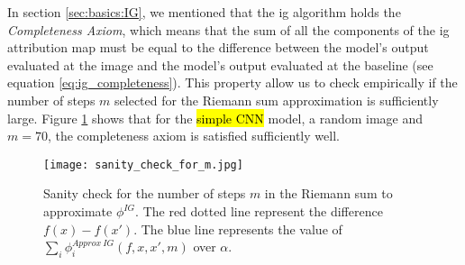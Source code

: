 In section \ref{sec:basics:IG}, we mentioned that the \gls{ig} algorithm holds the \textit{Completeness Axiom}, which means that the sum of all the components of the \gls{ig} attribution map must be equal to the difference between the model's output evaluated at the image and the model's output evaluated at the baseline (see equation \ref{eq:ig_completeness}). This property allow us to check empirically if the number of steps $m$ selected for the Riemann sum approximation is sufficiently large. Figure \ref{fig:VGIG_exp_set:m_sanity} shows that for the \hl{simple CNN} model, a random image and $m=70$, the  completeness axiom is satisfied sufficiently well.

\begin{figure}[!ht]
  \centering
  \texttt{[image: sanity\_check\_for\_m.jpg]}
  \caption{Sanity check for the number of steps $m$ in the Riemann sum to approximate $\phi^{IG}$. The red dotted line represent the difference $f(x)-f(x')$. The blue line represents the value of $\sum_i \phi^{Approx\ IG}_i(f, x, x', m)$ over $\alpha$.}
  \label{fig:VGIG_exp_set:m_sanity}
\end{figure}
